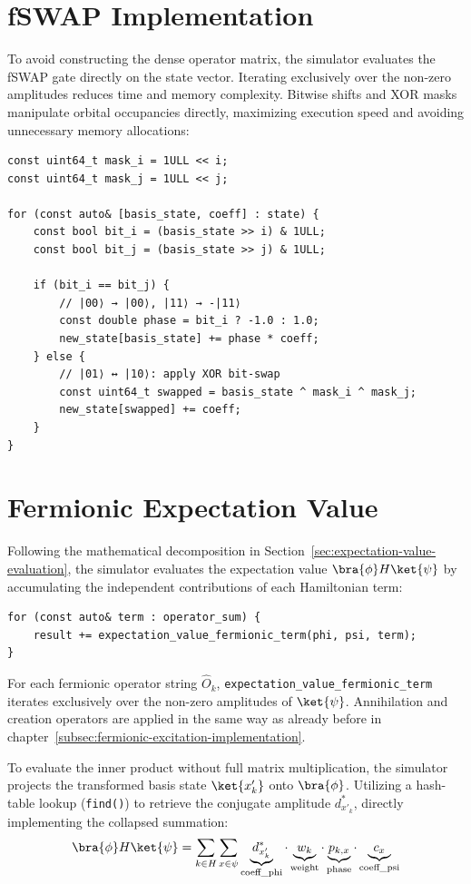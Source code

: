 \section{fSWAP Implementation}
To avoid constructing the dense operator matrix, the simulator evaluates the fSWAP gate directly on the state vector. Iterating exclusively over the non-zero amplitudes reduces time and memory complexity. Bitwise shifts and XOR masks manipulate orbital occupancies directly, maximizing execution speed and avoiding unnecessary memory allocations:

\begin{verbatim}
const uint64_t mask_i = 1ULL << i;
const uint64_t mask_j = 1ULL << j;

for (const auto& [basis_state, coeff] : state) {
    const bool bit_i = (basis_state >> i) & 1ULL;
    const bool bit_j = (basis_state >> j) & 1ULL;

    if (bit_i == bit_j) {
        // |00⟩ → |00⟩, |11⟩ → -|11⟩
        const double phase = bit_i ? -1.0 : 1.0;
        new_state[basis_state] += phase * coeff;
    } else {
        // |01⟩ ↔ |10⟩: apply XOR bit-swap
        const uint64_t swapped = basis_state ^ mask_i ^ mask_j;
        new_state[swapped] += coeff;
    }
}
\end{verbatim}


\section{Fermionic Expectation Value}
Following the mathematical decomposition in Section~\ref{sec:expectation-value-evaluation}, the simulator evaluates the expectation value $\bra{\phi} H \ket{\psi}$ by accumulating the independent contributions of each Hamiltonian term:

\begin{verbatim}
for (const auto& term : operator_sum) {
    result += expectation_value_fermionic_term(phi, psi, term);
}
\end{verbatim}

For each fermionic operator string $\hat{O}_k$, \texttt{expectation\_value\_fermionic\_term} iterates exclusively over the non-zero amplitudes of $\ket{\psi}$. Annihilation and creation operators are applied in the same way as already before in chapter~\ref{subsec:fermionic-excitation-implementation}.

To evaluate the inner product without full matrix multiplication, the simulator projects the transformed basis state $\ket{x'_k}$ onto $\bra{\phi}$. Utilizing a hash-table lookup (\texttt{find()}) to retrieve the conjugate amplitude $d_{x'_k}^*$, directly implementing the collapsed summation:
\begin{equation}
    \bra{\phi} H \ket{\psi} = \sum_{k \in H} \sum_{x \in \psi} \underbrace{d_{x'_k}^*}_{\text{coeff\_phi}} \cdot \underbrace{w_k}_{\text{weight}} \cdot \underbrace{p_{k,x}}_{\text{phase}} \cdot \underbrace{c_x}_{\text{coeff\_psi}}
\end{equation}

